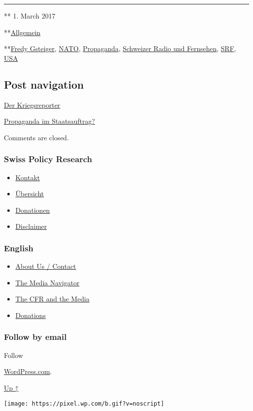 \begin{center}\rule{0.5\linewidth}{\linethickness}\end{center}

** 1. March 2017

**\href{https://swprs.org/category/allgemein/}{Allgemein}

**\href{https://swprs.org/tag/fredy-gsteiger/}{Fredy Gsteiger},
\href{https://swprs.org/tag/nato/}{NATO},
\href{https://swprs.org/tag/propaganda/}{Propaganda},
\href{https://swprs.org/tag/schweizer-radio-und-fernsehen/}{Schweizer
Radio und Fernsehen}, \href{https://swprs.org/tag/srf/}{SRF},
\href{https://swprs.org/tag/usa/}{USA}

\hypertarget{post-navigation}{%
\subsection{Post navigation}\label{post-navigation}}

\href{https://swprs.org/2017/03/01/der-kriegsreporter/}{Der
Kriegsreporter}

\href{https://swprs.org/2017/03/01/propaganda-im-staatsauftrag/}{Propaganda
im Staatsauftrag?}

Comments are closed.

\hypertarget{swiss-policy-research}{%
\subsubsection{Swiss Policy Research}\label{swiss-policy-research}}

\begin{itemize}
\tightlist
\item
  \href{https://swprs.org/kontakt/}{Kontakt}
\item
  \href{https://swprs.org/uebersicht/}{Übersicht}
\item
  \href{https://swprs.org/donationen/}{Donationen}
\item
  \href{https://swprs.org/disclaimer/}{Disclaimer}
\end{itemize}

\hypertarget{english}{%
\subsubsection{English}\label{english}}

\begin{itemize}
\tightlist
\item
  \href{https://swprs.org/contact/}{About Us / Contact}
\item
  \href{https://swprs.org/media-navigator/}{The Media Navigator}
\item
  \href{https://swprs.org/the-american-empire-and-its-media/}{The CFR
  and the Media}
\item
  \href{https://swprs.org/donations/}{Donations}
\end{itemize}

\hypertarget{follow-by-email}{%
\subsubsection{Follow by email}\label{follow-by-email}}

Follow

\href{https://wordpress.com/?ref=footer_custom_com}{WordPress.com}.

\protect\hyperlink{}{Up ↑}

\texttt{[image: https://pixel.wp.com/b.gif?v=noscript]}
